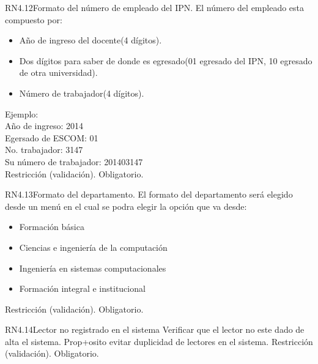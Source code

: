 \begin{BussinesRule}{RN4.12}{Formato del número de empleado del IPN.}
	\BRitem[Descripción:] El número del empleado esta compuesto por:
		\begin{itemize} 
			\item Año de ingreso del docente(4 dígitos).
			\item Dos dígitos para saber de donde es egresado(01 egresado del IPN, 10 egresado de otra universidad).
			\item Número de trabajador(4 dígitos).
		\end{itemize}
	Ejemplo:\\
		Año de ingreso: 2014\\
		Egersado de ESCOM: 01\\
		No. trabajador: 3147\\
		Su número de trabajador: 201403147\\
	\BRitem[Tipo:] Restricción (validación).
	\BRitem[Nivel:] Obligatorio.
\end{BussinesRule}


\begin{BussinesRule}{RN4.13}{Formato del departamento.} 
	\BRitem[Descripción:] El formato del departamento será elegido desde un menú en el cual se podra elegir la opción que va desde:
		\begin{itemize}
			\item Formación básica
			\item Ciencias e ingeniería de la computación
			\item Ingeniería en sistemas computacionales
			\item Formación integral e institucional
		\end{itemize}
	\BRitem[Tipo:] Restricción (validación).
	\BRitem[Nivel:] Obligatorio.
\end{BussinesRule}


\begin{BussinesRule}{RN4.14}{Lector no registrado en el sistema} 
	\BRitem[Descripción:] Verificar que el lector no este dado de alta el sistema. Prop+osito evitar duplicidad de lectores en el sistema.
	\BRitem[Tipo:] Restricción (validación).
	\BRitem[Nivel:] Obligatorio.
\end{BussinesRule}

